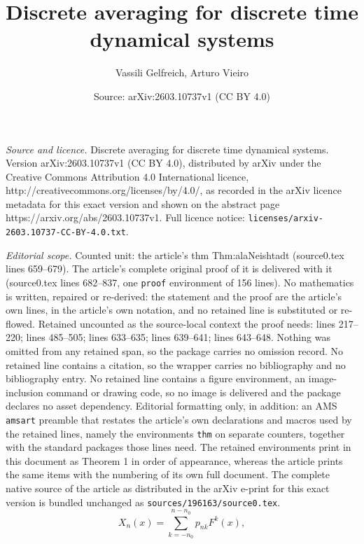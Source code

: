 \documentclass[10pt,a4paper]{amsart}
\title{Discrete averaging for discrete time dynamical systems}
\author{Vassili Gelfreich, Arturo Vieiro}
\date{Source: arXiv:2603.10737v1 (CC BY 4.0)}
\begin{document}
\maketitle

\noindent\emph{Source and licence.} Discrete averaging for discrete time dynamical systems. Version arXiv:2603.10737v1 (CC BY 4.0), distributed by arXiv under the Creative Commons Attribution 4.0 International licence, http://creativecommons.org/licenses/by/4.0/, as recorded in the arXiv licence metadata for this exact version and shown on the abstract page https://arxiv.org/abs/2603.10737v1. Full licence notice: \texttt{licenses/arxiv-2603.10737-CC-BY-4.0.txt}.\par\smallskip

\noindent\textit{Editorial scope.} Counted unit: the article's thm Thm:alaNeishtadt (source0.tex lines 659--679). The article's complete original proof of it is delivered with it (source0.tex lines 682--837, one \texttt{proof} environment of 156 lines). No mathematics is written, repaired or re-derived: the statement and the proof are the article's own lines, in the article's own notation, and no retained line is substituted or re-flowed.  Retained uncounted as the source-local context the proof needs: lines 217--220; lines 485--505; lines 633--635; lines 639--641; lines 643--648.  Nothing was omitted from any retained span, so the package carries no omission record.  No retained line contains a citation, so the wrapper carries no bibliography and no bibliography entry.  No retained line contains a figure environment, an image-inclusion command or drawing code, so no image is delivered and the package declares no asset dependency.  Editorial formatting only, in addition: an AMS \texttt{amsart} preamble that restates the article's own declarations and macros used by the retained lines, namely the environments \texttt{thm} on separate counters, together with the standard packages those lines need.  The retained environments print in this document as Theorem 1 in order of appearance, whereas the article prints the same items with the numbering of its own full document.  The complete native source of the article as distributed in the arXiv e-print for this exact version is bundled unchanged as \texttt{sources/196163/source0.tex}.
\begin{equation}\label{Eq:Xn_averaging}
X_{n}(x)=\sum_{k=-n_0}^{n-n_0}p_{nk}F^k(x)
,
\end{equation}
\end{document}
